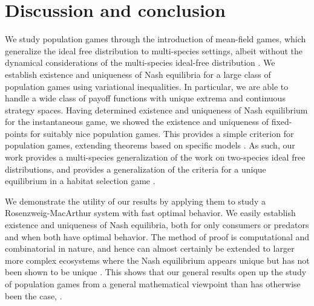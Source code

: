 \section{Discussion and conclusion}


\begin{comment}
We demonstrate that assuming a monomorphic population is not a viable alternative to the mean-field approach. We do this by showing that the pr. capita payoff a monomorphic population is twice what could be expected from playing the field  \citep{parker1978searching}. Hence, though a population of animals may all be indistinguishable, and appear to follow the same behavioral strategy, it is important to consider how this monomorphism emerges.
\end{comment}

We study population games through the introduction of mean-field games, which generalize the ideal free distribution \citep{fretwell1969territorial} to multi-species settings, albeit without the dynamical considerations of the multi-species ideal-free distribution \citep{cressman2010ideal}. We establish existence and uniqueness of Nash equilibria for a large class of population games using variational inequalities. In particular, we are able to handle a wide class of payoff functions with unique extrema and continuous strategy spaces. Having determined existence and uniqueness of Nash equilibrium for the instantaneous game, we showed the existence and uniqueness of fixed-points for suitably nice population games. This provides a simple criterion for population games, extending theorems based on specific models \citep{cressman2010ideal,sandholm2010population}. As such, our work provides a multi-species generalization of the work on two-species ideal free distributions, \citep{cressman2010ideal, cressman2004ideal} and provides a generalization of the criteria for a unique equilibrium in a habitat selection game \citep[Appendix B]{cressman2006migration}.



We demonstrate the utility of our results by applying them to study a Rosenzweig-MacArthur system with fast optimal behavior. We easily establish existence and uniqueness of Nash equilibria, both for only consumers or predators and when both have optimal behavior. The method of proof is computational and combinatorial in nature, and hence can almost certainly be extended to larger more complex ecosystems where the Nash equilibrium appears unique but has not been shown to be unique \cite{pinti2019trophic}.  This shows that our general results open up the study of population games from a general mathematical viewpoint than has otherwise been the case, \citep{cressman2010ideal, kvrivan2013behavioral, kvrivan2009evolutionary, broom2013game}.


